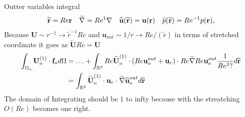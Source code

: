 Outter variables integral
\begin{align}
    \widetilde{\textbf{r}} = Re \textbf{r}
    && \widetilde{\grad} = Re^{1} \grad
    && \widetilde{\textbf{u}}(\widetilde{\textbf{r}}) = \textbf{u}(\textbf{r})
    && \widetilde{p}(\widetilde{\textbf{r}}) = Re^{-1} p(\textbf{r}),
\end{align}
Because $\textbf{U}\sim r^{-1} \to \widetilde{r}^{-1} Re $ and $\textbf{u}_{out} \sim 1/r \to Re/(\widetilde{r} )$ in terms of stretched coordinate it goes as $\widetilde{\textbf{U}} Re = \textbf{U}$
\begin{align}
    \intO[o]{\textbf{U}_{o}^{(1)}\cdot \textbf{f}_{o}}
    &=
    \ldots +  \int_{\mathbb{R}^3}Re \widetilde{\textbf{U}}_{o}^{(1)}\cdot (Re \textbf{u}_{o}^{out}+\textbf{u}_r)\cdot Re \widetilde{\grad}  Re\textbf{u}_{o}^{out} \frac{1}{Re^3 ? } d\widetilde{\textbf{r}}\\
    &=\int_{\mathbb{R}^3} \widetilde{\textbf{U}}_{o}^{(1)}\cdot  \textbf{u}_r \cdot  \widetilde{\grad}  \widetilde{\textbf{u}}_{o}^{out} d\widetilde{\textbf{r}}
\end{align}
The domain of Integrating should be $1$ to infty because with the streatching $O(Re)$ becomes one right.

